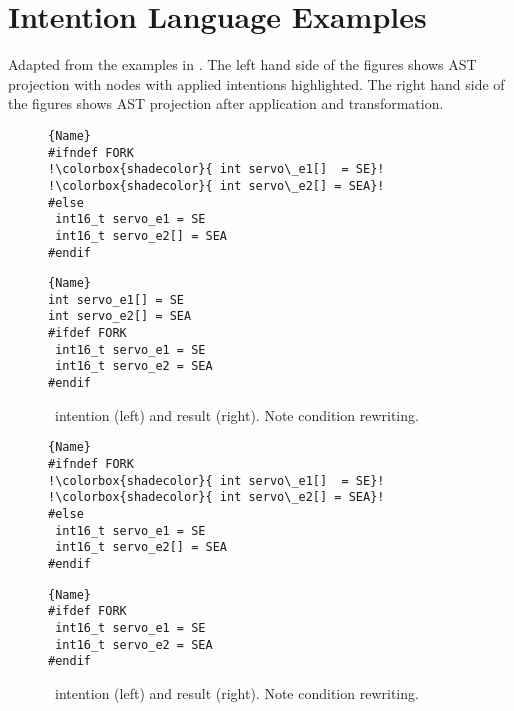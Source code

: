 \chapter{Intention Language Examples}\label{a:intentions}
Adapted from the examples in \cite{lillack2017intentions}. The left hand side of the figures shows AST projection with nodes with applied intentions \colorbox{shadecolor}{highlighted}. The right hand side of the figures shows AST projection after application and transformation.

\begin{figure}[ht]
    \centering
    \begin{minipage}{.35\textwidth}
\begin{lstlisting}[caption=Wrapped code by PC,escapechar=!]{Name}
#ifndef FORK
!\colorbox{shadecolor}{ int servo\_e1[]  = SE}!
!\colorbox{shadecolor}{ int servo\_e2[] = SEA}!
#else
 int16_t servo_e1 = SE
 int16_t servo_e2[] = SEA
#endif
\end{lstlisting}
\end{minipage}\qquad
\begin{minipage}{.35\textwidth}
\begin{lstlisting}[caption=Unwrapped code,escapechar=!]{Name}
int servo_e1[] = SE
int servo_e2[] = SEA
#ifdef FORK
 int16_t servo_e1 = SE
 int16_t servo_e2 = SEA
#endif
\end{lstlisting}
    \end{minipage}
    \caption{\keep~intention (left) and result (right). Note condition rewriting.}
    \label{fig:keep}
\end{figure}

\begin{figure}[ht]
    \centering
    \begin{minipage}{.35\textwidth}
\begin{lstlisting}[caption=Wrapped code by PC,escapechar=!]{Name}
#ifndef FORK
!\colorbox{shadecolor}{ int servo\_e1[]  = SE}!
!\colorbox{shadecolor}{ int servo\_e2[] = SEA}!
#else
 int16_t servo_e1 = SE
 int16_t servo_e2[] = SEA
#endif
\end{lstlisting}
\end{minipage}\qquad
\begin{minipage}{.35\textwidth}
\begin{lstlisting}[caption=Unwrapped code,escapechar=!]{Name}
#ifdef FORK
 int16_t servo_e1 = SE
 int16_t servo_e2 = SEA
#endif
\end{lstlisting}
    \end{minipage}
    \caption{\remove~intention (left) and result (right). Note condition rewriting.}
    \label{fig:remove}
\end{figure}

